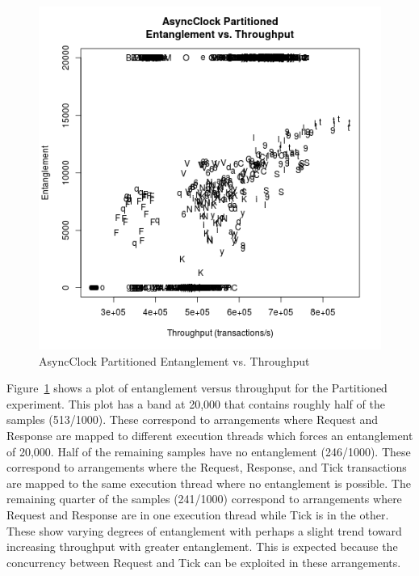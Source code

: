 \begin{figure}[H]
\center
\includegraphics[height=.4\textheight]{async_partitioned_throughput_entanglement.png}
\caption{AsyncClock Partitioned Entanglement vs. Throughput}
\label{async_partitioned_throughput_entanglement}
\end{figure}

Figure~\ref{async_partitioned_throughput_entanglement} shows a plot of entanglement versus throughput for the Partitioned experiment.
This plot has a band at 20,000 that contains roughly half of the samples (513/1000).
These correspond to arrangements where Request and Response are mapped to different execution threads which forces an entanglement of 20,000.
Half of the remaining samples have no entanglement (246/1000).
These correspond to arrangements where the Request, Response, and Tick transactions are mapped to the same execution thread where no entanglement is possible.
The remaining quarter of the samples (241/1000) correspond to arrangements where Request and Response are in one execution thread while Tick is in the other.
These show varying degrees of entanglement with perhaps a slight trend toward increasing throughput with greater entanglement.
This is expected because the concurrency between Request and Tick can be exploited in these arrangements.

